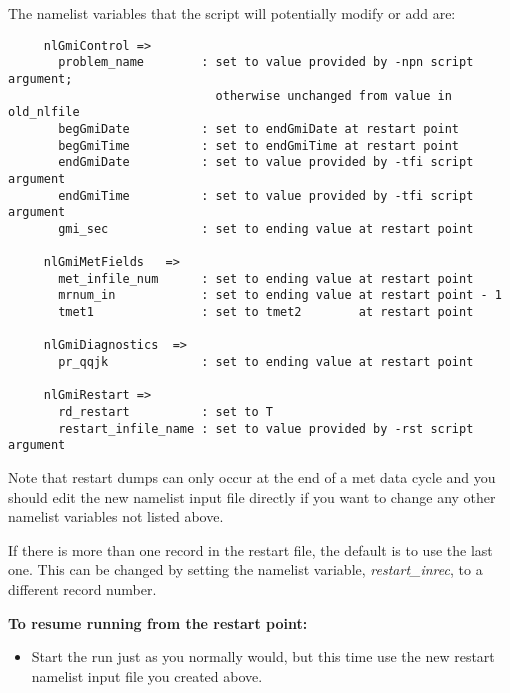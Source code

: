 \newline
\newline
The namelist variables that the script will potentially modify or add are:
%
\begin{verbatim}
     nlGmiControl =>
       problem_name        : set to value provided by -npn script argument;
                             otherwise unchanged from value in old_nlfile
       begGmiDate          : set to endGmiDate at restart point
       begGmiTime          : set to endGmiTime at restart point
       endGmiDate          : set to value provided by -tfi script argument
       endGmiTime          : set to value provided by -tfi script argument
       gmi_sec             : set to ending value at restart point

     nlGmiMetFields   =>
       met_infile_num      : set to ending value at restart point
       mrnum_in            : set to ending value at restart point - 1
       tmet1               : set to tmet2        at restart point

     nlGmiDiagnostics  =>
       pr_qqjk             : set to ending value at restart point

     nlGmiRestart =>
       rd_restart          : set to T
       restart_infile_name : set to value provided by -rst script argument
\end{verbatim}
%
Note that restart dumps can only occur at the end of a met data cycle and
you should edit the new namelist input file directly if you want to change
any other namelist variables not listed above.

If there is more than one record in the restart file, the default is to
use the last one.  This can be changed by setting the namelist variable,
{\em restart\_inrec}, to a different record number.

\vskip 1.0cm

\noindent
{\bf To resume running from the restart point: }
%
\begin{itemize}
\item Start the run just as you normally would, but this time use the new
   restart namelist input file you created above.
\end{itemize}
